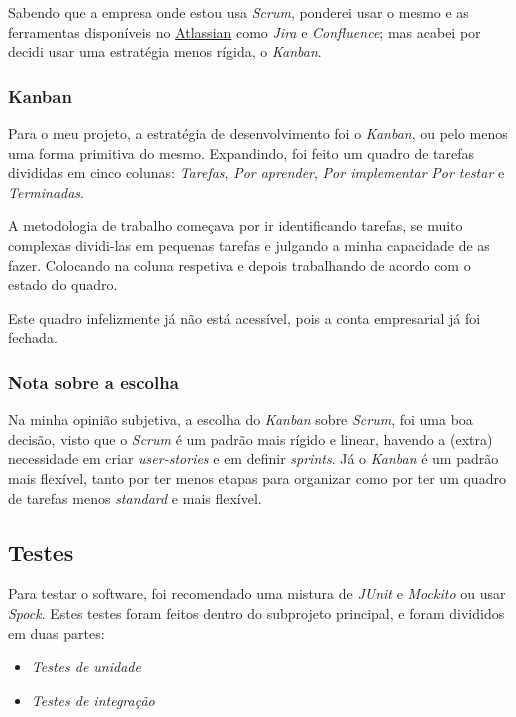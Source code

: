 Sabendo que a empresa onde estou usa \textit{Scrum}, ponderei usar o mesmo e as ferramentas disponíveis no \href{https://www.atlassian.com/}{Atlassian} como \textit{Jira} e \textit{Confluence}; mas acabei por decidi usar uma estratégia menos rígida, o \textit{Kanban}.

\subsubsection{Kanban}

Para o meu projeto, a estratégia de desenvolvimento foi o \textit{Kanban}, ou pelo menos uma forma primitiva do mesmo. Expandindo, foi feito um quadro de tarefas divididas em cinco colunas: \textit{Tarefas}, \textit{Por aprender}, \textit{Por implementar} \textit{Por testar} e \textit{Terminadas}.

A metodologia de trabalho começava por ir identificando tarefas, se muito complexas dividi-las em pequenas tarefas e julgando a minha capacidade de as fazer. Colocando na coluna respetiva e depois trabalhando de acordo com o estado do quadro.

Este quadro infelizmente já não está acessível, pois a conta empresarial já foi fechada.

\subsubsection{Nota sobre a escolha}

Na minha opinião subjetiva, a escolha do \textit{Kanban} sobre \textit{Scrum}, foi uma boa decisão, visto que o \textit{Scrum} é um padrão mais rígido e linear, havendo a (extra) necessidade em criar \textit{user-stories} e em definir \textit{sprints}. Já o \textit{Kanban} é um padrão mais flexível, tanto por ter menos etapas para organizar como por ter um quadro de tarefas menos \textit{standard} e mais flexível.

\subsection{Testes}

Para testar o software, foi recomendado uma mistura de \textit{JUnit} e \textit{Mockito} ou usar \textit{Spock}. Estes testes foram feitos dentro do subprojeto principal, e foram divididos em duas partes:

\begin{itemize}
  \item \textit{Testes de unidade}
  \item \textit{Testes de integração}
\end{itemize}

